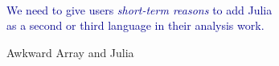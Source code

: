 \documentclass[aspectratio=169]{beamer}
\begin{document}
\begin{frame}{\mbox{ }}
\vspace{0.5 cm}
\LARGE
\begin{center}
\textcolor{darkblue}{We need to give users {\it short-term reasons} to add Julia \\ as a second or third language in their analysis work.}
\end{center}
\end{frame}

\begin{frame}{Awkward Array and Julia}
\vspace{0.2 cm}
\end{frame}

\begin{frame}{}

\end{frame}

\end{document}
